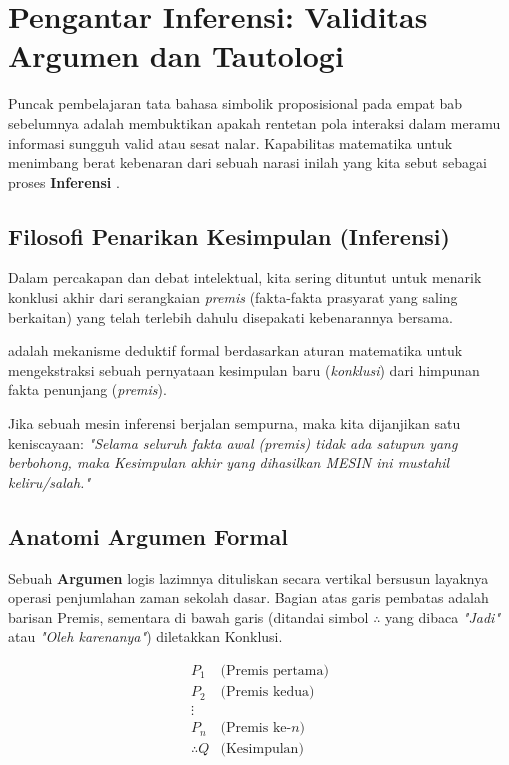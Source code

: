 \section{Pengantar Inferensi: Validitas Argumen dan Tautologi}

Puncak pembelajaran tata bahasa simbolik proposisional pada empat bab sebelumnya adalah membuktikan apakah rentetan pola interaksi dalam meramu informasi sungguh valid atau sesat nalar. Kapabilitas matematika untuk menimbang berat kebenaran dari sebuah narasi inilah yang kita sebut sebagai proses \textbf{Inferensi} \cite{rosen2019}.

\subsection{Filosofi Penarikan Kesimpulan (Inferensi)}

Dalam percakapan dan debat intelektual, kita sering dituntut untuk menarik konklusi akhir dari serangkaian \textit{premis} (fakta-fakta prasyarat yang saling berkaitan) yang telah terlebih dahulu disepakati kebenarannya bersama.

\begin{definisi}
 adalah mekanisme deduktif formal berdasarkan aturan matematika untuk mengekstraksi sebuah pernyataan kesimpulan baru (\textit{konklusi}) dari himpunan fakta penunjang (\textit{premis}).
\end{definisi}

Jika sebuah mesin inferensi berjalan sempurna, maka kita dijanjikan satu keniscayaan: \textit{"Selama seluruh fakta awal (premis) tidak ada satupun yang berbohong, maka Kesimpulan akhir yang dihasilkan MESIN ini mustahil keliru/salah."}

\subsection{Anatomi Argumen Formal}

Sebuah \textbf{Argumen} logis lazimnya dituliskan secara vertikal bersusun layaknya operasi penjumlahan zaman sekolah dasar. Bagian atas garis pembatas adalah barisan Premis, sementara di bawah garis (ditandai simbol $\therefore$ yang dibaca \textit{"Jadi"} atau \textit{"Oleh karenanya"}) diletakkan Konklusi.

\[
\begin{array}{ll}
P_1 & \text{(Premis pertama)} \\
P_2 & \text{(Premis kedua)} \\
\vdots & \\
P_n & \text{(Premis ke-} n) \\
\hline
\therefore Q & \text{(Kesimpulan)}
\end{array}
\]


